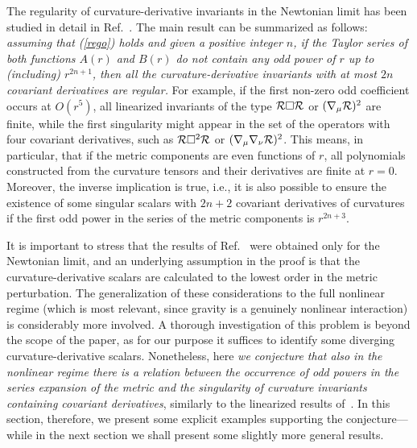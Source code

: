 \documentclass[aps,prd,a4paper,twocolumn,showpacs,showkeys,preprintnumbers,amsmath,amssymb,nofootinbib,usenames,dvipsnames]{revtex4-2}
\newcommand{\eq}[1]{(\ref{#1})}
\begin{document}
The regularity of curvature-derivative invariants in the Newtonian limit has been studied in detail in Ref.~\cite{Nos6der}. The main result can be summarized as follows: 
{\em assuming that \eq{rego} holds and given a positive integer $n$, if the Taylor series of both functions $A(r)$ and $B(r)$ do not contain any odd power of $r$ up to (including) $r^{2n+1}$, then all the curvature-derivative invariants with at most $2n$ covariant derivatives are regular.}
For example, if the first non-zero odd coefficient occurs at $O(r^5)$, all linearized invariants of the type ${\cal R} \Box {\cal R}$ or $(\nabla_\mu {\cal R})^2$  are finite, while the first singularity might appear in the set of the operators with four covariant derivatives, such as ${\cal R} \Box^2 {\cal R}$ or $(\nabla_\mu \nabla_\nu {\cal R})^2$. This means, in particular, that if the metric components are even functions of $r$, all polynomials constructed from the curvature tensors and their derivatives are finite at $r = 0$. Moreover, the inverse implication is true, i.e.,
it is also possible to ensure the existence of some singular scalars with $2n+2$ covariant derivatives of curvatures if the first odd power in the series of the metric components is $r^{2n+3}$.

It is important to stress that the results of Ref.~\cite{Nos6der} were obtained only for the Newtonian limit, and an underlying assumption in the proof is that the curvature-derivative scalars are calculated to the lowest order in the metric perturbation. The generalization of these considerations to the full nonlinear regime (which is most relevant, since gravity is a genuinely nonlinear interaction) is considerably more involved. A thorough investigation of this problem is beyond the scope of the paper, as for our purpose it suffices to identify some diverging curvature-derivative scalars. Nonetheless, here {\em we conjecture that also in the nonlinear regime there is a relation between the occurrence of odd powers in the series expansion of the metric and the singularity of curvature invariants containing covariant derivatives}, similarly to the linearized results of~\cite{Nos6der}. In this section, therefore, we present some explicit examples supporting the conjecture---while in the next section we shall present some slightly more general results.
\end{document}
